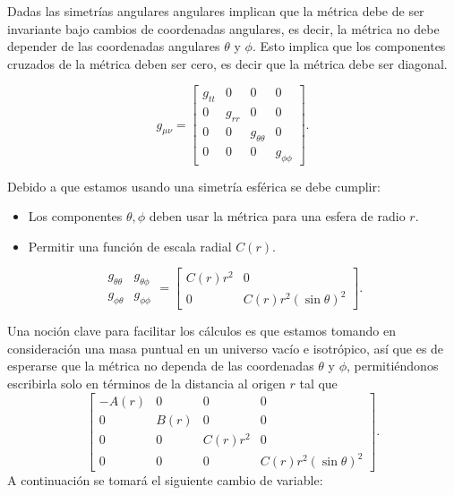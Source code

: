 Dadas las simetrías angulares angulares implican que la métrica debe de ser invariante bajo cambios de coordenadas angulares, es decir, la métrica no debe depender de las coordenadas angulares \(\theta\) y \(\phi\). Esto implica que los componentes cruzados de la métrica deben ser cero, es decir que la métrica debe ser diagonal. 



\begin{equation}
    g_{\mu \nu} =
    \begin{bmatrix}
        g_{tt} & 0            & 0                & 0              \\
        0      & g_{rr}       &   0    &  0  \\
        0      & 0 & g_{\theta\theta} &0 \\
        0      &  0  & 0 & g_{\phi\phi}
    \end{bmatrix}.
\end{equation}


Debido a que estamos usando una simetría esférica se debe cumplir:
\begin{itemize}
    \item Los componentes $\theta, \phi$ deben usar la métrica para una esfera de radio $r$.
    \item Permitir una función de escala radial $C(r)$.
\end{itemize}

\begin{equation}
    \begin{array}{ll}
        g_{\theta \theta} & g_{\theta \phi} \\
        g_{\phi \theta}   & g_{\phi \phi}
    \end{array} = \left[\begin{array}{cc}
            C(r) r^2 & 0                       \\
            0        & C(r) r^2(\sin \theta)^2
        \end{array}\right].
\end{equation}

Una noción clave para facilitar los cálculos es que estamos tomando en consideración una masa puntual en un universo vacío e isotrópico, así que es de esperarse que la métrica no dependa de las coordenadas $\theta$ y $\phi$, permitiéndonos escribirla solo en términos de la distancia al origen $r$ tal que
\begin{equation}
    \left[\begin{array}{cccc}
            -A(r) & 0    & 0        & 0                       \\
            0     & B(r) & 0        & 0                       \\
            0     & 0    & C(r) r^2 & 0                       \\
            0     & 0    & 0        & C(r) r^2(\sin \theta)^2
        \end{array}\right].
        \label{eq:genericMetric}
\end{equation}
A continuación se tomará el siguiente cambio de variable:

